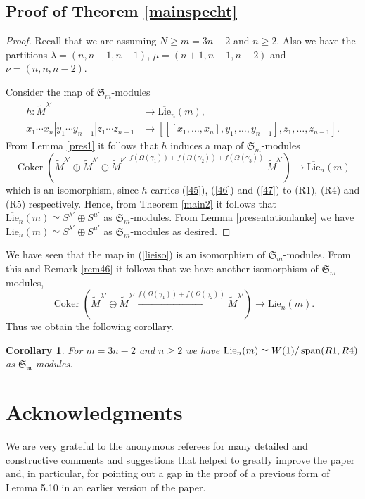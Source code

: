 \documentclass[11pt]{amsart}
\newtheorem{cor}[thm]{Corollary}
\theoremstyle{definition}
\numberwithin{equation}{section}
\DeclareMathOperator{\coker}{Coker}
\DeclareMathOperator{\spn}{span}
\begin{document}
\subsection{Proof of Theorem \ref{mainspecht}} \begin{proof}Recall that we are assuming $N \ge m=3n-2$ and $n \ge 2$. Also we have the partitions $\lambda=(n,n-1,n-1)$, $\mu=(n+1,n-1,n-2)$ and $\nu=(n,n,n-2)$.

Consider the map of $\mathfrak{S}_m$-modules
\begin{align*}h:\tilde{M}^{\lambda'} &\to \overline{\text{Lie}}_n(m), \\ x_1 \cdots x_n|y_1 \cdots y_{n-1}|z_1 \cdots z_{n-1} &\mapsto [[[x_1,\dots,x_n],y_1,\dots,y_{n-1}],z_1, \dots, z_{n-1}]. \end{align*}
From Lemma \ref{pres1} it follows that $h$ induces a map of $\mathfrak{S}_m$-modules \begin{equation}\label{lieiso} \coker(\tilde{M}^{\lambda'} \oplus \tilde{M}^{\lambda'} \oplus \tilde{M}^{\nu'} \xrightarrow{f(\Omega(\gamma_1)) + f(\Omega(\gamma_2))+ f(\Omega(\gamma_3))} \tilde{M}^{\lambda'}) \to \overline{\text{Lie}}_n(m) \end{equation}
which is an isomorphism, since $h$ carries (\ref{45}), (\ref{46}) and (\ref{47}) to (R1), (R4) and (R5) respectively. 
Hence, from Theorem \ref{main2} it follows that $\overline{\text{Lie}}_n(m) \simeq S^{\lambda'} \oplus S^{\mu'}$ as $\mathfrak{S}_m$-modules. From Lemma \ref{presentationlanke} we have $\text{Lie}_n(m) \simeq S^{\lambda'} \oplus S^{\mu'}$ as $\mathfrak{S}_m$-modules as desired.\end{proof}

We have seen that the map in (\ref{lieiso}) is an isomorphism of $\mathfrak{S}_m$-modules.  From this and Remark \ref{rem46} it follows that we  have another isomorphism of $\mathfrak{S}_m$-modules, 
	\begin{equation}\label{lieiso2} \coker(\tilde{M}^{\lambda'} \oplus \tilde{M}^{\lambda'} \xrightarrow{f(\Omega(\gamma_1)) + f(\Omega(\gamma_2))} \tilde{M}^{\lambda'}) \to \text{Lie}_n(m). \end{equation}
	Thus we obtain the following corollary.

\begin{cor} For $m=3n-2$ and $n \ge 2$ we have $\textup{Lie}_{n}(m) \simeq W(1)/\spn(R1, R4)$ as $\mathfrak{S_m}$-modules.
	\end{cor}

\section*{Acknowledgments}
We are  very grateful to the anonymous referees for many detailed and constructive  comments and suggestions that helped to greatly improve the paper and, in particular, for pointing out a gap in the proof of a previous form of Lemma 5.10 in an earlier version of the paper. 
\end{document}
